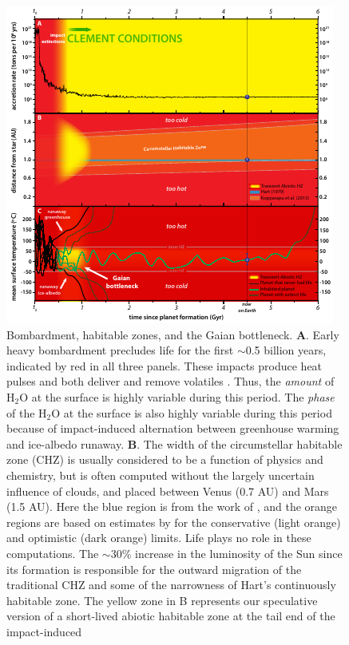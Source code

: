 \begin{figure}[!htbp]
	\centering
	\includegraphics[width=0.9\linewidth]{figures/HZs.pdf}
	\caption[Habitable zones and the Gaian bottleneck]{
Bombardment, habitable zones, and the Gaian bottleneck.
\textbf{A}. Early heavy bombardment precludes life for the first $\sim$0.5 billion years, indicated by red in all three panels.
These impacts produce heat pulses and both deliver and remove volatiles \citep{Elkins-Tanton2011a}. 
Thus, the \textit{amount} of H$_{2}$O at the surface is highly variable during this period.
The \textit{phase} of the H$_{2}$O at the surface is also highly variable during this period because of impact-induced
alternation between greenhouse warming and ice-albedo runaway.
%
\textbf{B}. The width of the circumstellar habitable zone (CHZ) is usually considered to be a function of physics and chemistry, but
is often computed without the largely uncertain influence of clouds, and placed between Venus (0.7 AU) and Mars (1.5 AU). Here the blue region is from the work of \citet{Hart1979}, and the orange regions are based on estimates by \citet{Kopparapu2013} for the conservative (light orange) and optimistic (dark orange) limits. Life plays no role in these computations. The $\sim$30\% increase in the luminosity of the Sun since its formation is responsible for the outward migration of the traditional CHZ and some of the narrowness of Hart's continuously habitable zone.
The yellow zone in B represents our speculative version of a short-lived abiotic habitable zone at the tail end of the impact-induced
}
\end{figure}
